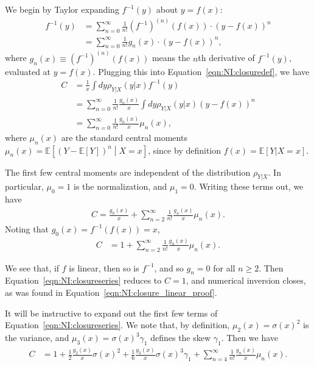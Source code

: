 We begin by Taylor expanding $f^{-1}(y)$ about $y=f(x)$:
\begin{align}
f^{-1}(y) &= \sum_{n=0}^\infty \frac{1}{n!}\left(f^{-1}\right)^{(n)}\left(f(x)\right)\cdot\left(y-f(x)\right)^n\nonumber\\
&=\sum_{n=0}^\infty \frac{1}{n!}g_n(x)\cdot\left(y-f(x)\right)^n,
\end{align}
where $g_n(x) \equiv (f^{-1})^{(n)}(f(x))$ means the $n$th derivative of $f^{-1}(y)$, evaluated at $y=f(x)$. Plugging this into Equation~\ref{eqn:NI:closuredef}, we have
\begin{align}
C &= \frac{1}{x}\int dy \rho_{Y|X}(y|x) f^{-1}(y)\nonumber\\
&=\sum_{n=0}^\infty \frac{1}{n!}\frac{g_n(x)}{x}\int dy \rho_{Y|X}(y|x) \left(y-f(x)\right)^n\nonumber\\
&=\sum_{n=0}^\infty \frac{1}{n!}\frac{g_n(x)}{x} \mu_n(x),
\end{align}
where $\mu_n(x)$ are the standard central moments $\mu_n(x) = \mathbb{E}\left[\left(Y-\mathbb{E}\left[Y\right]\right)^n\middle| X=x\right]$, since by definition $f(x)=\mathbb{E}[Y|X=x]$.

The first few central moments are independent of the distribution $\rho_{Y|X}$.  In particular, $\mu_0 = 1$ is the normalization, and $\mu_1 = 0$. Writing these terms out, we have
\begin{align}
C =\frac{g_0(x)}{x}+\sum_{n=2}^\infty \frac{1}{n!}\frac{g_n(x)}{x} \mu_n(x).
\end{align}
Noting that $g_0(x) = f^{-1}(f(x)) = x$,
\begin{align}
C &=1+\sum_{n=2}^\infty \frac{1}{n!}\frac{g_n(x)}{x} \mu_n(x).\label{eqn:NI:closureseries}
\end{align}

\noindent We see that, if $f$ is linear, then so is $f^{-1}$, and so $g_n = 0$ for all $n\ge 2$. Then Equation~\ref{eqn:NI:closureseries} reduces to $C=1$, and numerical inversion closes, as was found in Equation~\ref{eqn:NI:closure_linear_proof}.

It will be instructive to expand out the first few terms of Equation~\ref{eqn:NI:closureseries}. We note that, by definition, $\mu_2(x) = \sigma(x)^2$ is the variance, and $\mu_3(x) = \sigma(x)^3\gamma_1$ defines the skew $\gamma_1$. Then we have
\begin{align}
C &=1+\frac{1}{2}\frac{g_2(x)}{x}\sigma(x)^2+\frac{1}{6}\frac{g_3(x)}{x}\sigma(x)^3\gamma_1+\sum_{n=4}^\infty \frac{1}{n!}\frac{g_n(x)}{x} \mu_n(x).\label{eqn:NI:closureseriesexpand}
\end{align}


